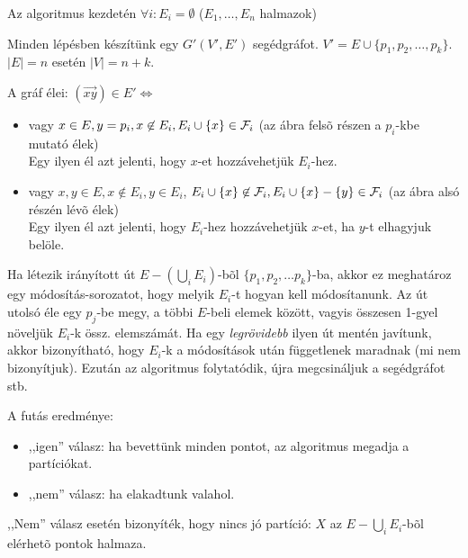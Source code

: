 \begin{algoritmus}
Az algoritmus kezdetén $\forall i: E_i = \emptyset$ ($E_1, \ldots, E_n$
halmazok)

Minden lépésben készítünk egy $G'(V', E')$ segédgráfot. $V' = E \cup \{p_1, p_2,
\ldots, p_k\}$. $|E|=n$ esetén $|V|=n+k$.

A gráf élei: $(\overrightarrow{xy}) \in E' \Leftrightarrow$

\begin{itemize}
  \item vagy $x \in E, y = p_i, x \not\in E_i, E_i \cup \{x\} \in \mathcal{F}_i$ (az ábra
  felsõ részen a $p_i$-kbe mutató élek)\\
  Egy ilyen él azt jelenti, hogy $x$-et hozzávehetjük $E_i$-hez.
  \item vagy $x,y \in E, x \not\in E_i, y \in E_i$, $E_i \cup \{x\} \not\in
  \mathcal{F}_i, E_i \cup \{x\} - \{y\} \in \mathcal{F}_i$ (az ábra alsó részén lévõ élek)\\ Egy
  ilyen él azt jelenti, hogy $E_i$-hez hozzávehetjük $x$-et, ha $y$-t elhagyjuk
  belöle.
\end{itemize}

\begin{figure}[hb]
\centering
\caption{}
\label{fig:futas1}
\end{figure}

Ha létezik irányított út $E-(\bigcup_i E_i)$-bõl $\{p_1, p_2, \ldots p_k\}$-ba,
akkor ez meghatároz egy módosítás-sorozatot, hogy melyik $E_i$-t hogyan kell
módosítanunk. Az út utolsó éle egy $p_j$-be megy, a többi $E$-beli elemek
között, vagyis összesen 1-gyel növeljük $E_i$-k össz. elemszámát. Ha egy {\it
legrövidebb} ilyen út mentén javítunk, akkor bizonyítható, hogy $E_i$-k a
módosítások után függetlenek maradnak (mi nem bizonyítjuk). Ezután az algoritmus
folytatódik, újra megcsináljuk a segédgráfot stb.

\end{algoritmus}

A futás eredménye:

\begin{itemize}
  \item ,,igen'' válasz: ha bevettünk minden pontot, az algoritmus megadja a partíciókat.
  \item ,,nem'' válasz: ha elakadtunk valahol.
\end{itemize}

,,Nem'' válasz esetén bizonyíték, hogy nincs jó partíció: $X$ az $E - \bigcup_i
E_i$-bõl elérhetõ pontok halmaza.

